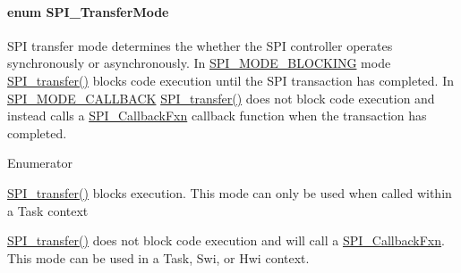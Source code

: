 \paragraph[{S\-P\-I\-\_\-\-Transfer\-Mode}]{\setlength{\rightskip}{0pt plus 5cm}enum {\bf S\-P\-I\-\_\-\-Transfer\-Mode}}\label{_s_p_i_8h_ab9ea76c6529d6076eee5e1c4a5a92c6f}


S\-P\-I transfer mode determines the whether the S\-P\-I controller operates synchronously or asynchronously. In \hyperlink{_s_p_i_8h_ab9ea76c6529d6076eee5e1c4a5a92c6fa0dfb2358e008316426895e7237c398e8}{S\-P\-I\-\_\-\-M\-O\-D\-E\-\_\-\-B\-L\-O\-C\-K\-I\-N\-G} mode \hyperlink{_s_p_i_8h_a989e17f96b54fcc3dc2cac5f8ac6bdb2}{S\-P\-I\-\_\-transfer()} blocks code execution until the S\-P\-I transaction has completed. In \hyperlink{_s_p_i_8h_ab9ea76c6529d6076eee5e1c4a5a92c6fa5631e69925c47a62a261c78ebbda39fb}{S\-P\-I\-\_\-\-M\-O\-D\-E\-\_\-\-C\-A\-L\-L\-B\-A\-C\-K} \hyperlink{_s_p_i_8h_a989e17f96b54fcc3dc2cac5f8ac6bdb2}{S\-P\-I\-\_\-transfer()} does not block code execution and instead calls a \hyperlink{_s_p_i_8h_aeb03e7608a14021c3b0acf92c90e2168}{S\-P\-I\-\_\-\-Callback\-Fxn} callback function when the transaction has completed. 

\begin{Desc}
\item[Enumerator]\par
\begin{description}
\item[{\em 
S\-P\-I\-\_\-\-M\-O\-D\-E\-\_\-\-B\-L\-O\-C\-K\-I\-N\-G\label{_s_p_i_8h_ab9ea76c6529d6076eee5e1c4a5a92c6fa0dfb2358e008316426895e7237c398e8}
}]\hyperlink{_s_p_i_8h_a989e17f96b54fcc3dc2cac5f8ac6bdb2}{S\-P\-I\-\_\-transfer()} blocks execution. This mode can only be used when called within a Task context \item[{\em 
S\-P\-I\-\_\-\-M\-O\-D\-E\-\_\-\-C\-A\-L\-L\-B\-A\-C\-K\label{_s_p_i_8h_ab9ea76c6529d6076eee5e1c4a5a92c6fa5631e69925c47a62a261c78ebbda39fb}
}]\hyperlink{_s_p_i_8h_a989e17f96b54fcc3dc2cac5f8ac6bdb2}{S\-P\-I\-\_\-transfer()} does not block code execution and will call a \hyperlink{_s_p_i_8h_aeb03e7608a14021c3b0acf92c90e2168}{S\-P\-I\-\_\-\-Callback\-Fxn}. This mode can be used in a Task, Swi, or Hwi context. \end{description}
\end{Desc}


